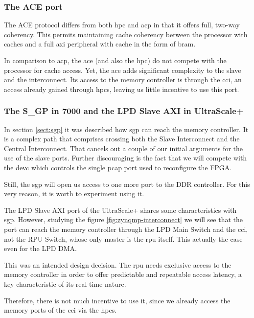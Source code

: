 \subsubsection{The ACE port}

The ACE protocol differs from both \gls{hpc} and \gls{acp}
in that it offers full, two-way coherency. This permits
maintaining cache coherency between the processor with caches and a
full \gls{axi} peripheral with cache in the form of \gls{bram}.

In comparison to \gls{acp}, the \gls{ace} (and also the \gls{hpc}) do not compete
with the processor for cache access.
Yet, the \gls{ace} adds significant complexity to the slave and the interconnect.
Its access to the memory controller is through the \gls{cci}, an access already
gained through \glspl{hpc}, leaving us little incentive to use this port.

\subsubsection{The S\_GP in 7000 and the LPD Slave AXI in UltraScale+}

In section \ref{sect:sgp} it was described how \gls{sgp} can reach the memory controller.
It is a complex path that comprises crossing both the Slave Interconnect and the Central
Interconnect. That cancels out a couple of our initial arguments for the use of the slave ports.
Further discouraging is the fact that we will compete
with the \gls{devc} which controls the single \gls{pcap}
port used to reconfigure the FPGA.

Still, the \gls{sgp} will open us access to one more port to the DDR controller.
For this very reason, it is worth to experiment using it.

The LPD Slave AXI port of the UltraScale+ shares some characteristics with \gls{sgp}.
However, studying the figure \ref{fig:zynqmp-interconnect} we will see that the port
can reach the memory controller through the LPD Main Switch and the \gls{cci},
not the RPU Switch, whose only master is the \gls{rpu} itself.
This actually the case even for the LPD DMA.

This was an intended design decision. The \gls{rpu} needs exclusive access to the
memory controller in order to offer predictable and repeatable access latency,
a key characteristic of its real-time nature.

Therefore, there is not much incentive to use it, since we already access the
memory ports of the \gls{cci} via the \glspl{hpc}.

